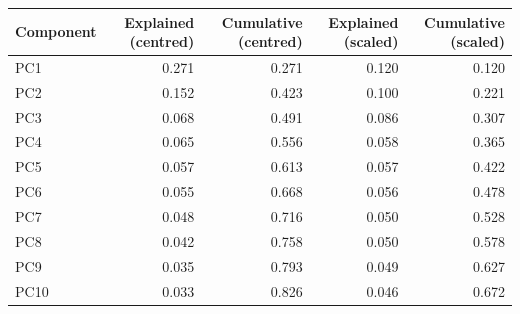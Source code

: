 \begin{tabular}{lrrrr}
\toprule
\textbf{Component} & \textbf{Explained (centred)} & \textbf{Cumulative (centred)} & \textbf{Explained (scaled)} & \textbf{Cumulative (scaled)} \\
\midrule
PC1 & 0.271 & 0.271 & 0.120 & 0.120 \\
PC2 & 0.152 & 0.423 & 0.100 & 0.221 \\
PC3 & 0.068 & 0.491 & 0.086 & 0.307 \\
PC4 & 0.065 & 0.556 & 0.058 & 0.365 \\
PC5 & 0.057 & 0.613 & 0.057 & 0.422 \\
PC6 & 0.055 & 0.668 & 0.056 & 0.478 \\
PC7 & 0.048 & 0.716 & 0.050 & 0.528 \\
PC8 & 0.042 & 0.758 & 0.050 & 0.578 \\
PC9 & 0.035 & 0.793 & 0.049 & 0.627 \\
PC10 & 0.033 & 0.826 & 0.046 & 0.672 \\
\bottomrule
\end{tabular}
